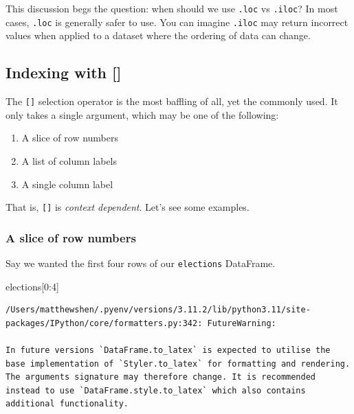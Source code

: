 \documentclass[
  letterpaper,
  DIV=11,
  numbers=noendperiod]{scrreprt}
\newenvironment{Shaded}{\begin{snugshade}}{\end{snugshade}}
\newcommand{\DecValTok}[1]{\textcolor[rgb]{0.68,0.00,0.00}{#1}}
\newcommand{\NormalTok}[1]{\textcolor[rgb]{0.00,0.23,0.31}{#1}}
\providecommand{\tightlist}{%
  \setlength{\itemsep}{0pt}\setlength{\parskip}{0pt}}\usepackage{longtable,booktabs,array}
\begin{document}
This discussion begs the question: when should we use \texttt{.loc} vs
\texttt{.iloc}? In most cases, \texttt{.loc} is generally safer to use.
You can imagine \texttt{.iloc} may return incorrect values when applied
to a dataset where the ordering of data can change.

\hypertarget{indexing-with}{%
\subsection{Indexing with {[}{]}}\label{indexing-with}}

The \texttt{{[}{]}} selection operator is the most baffling of all, yet
the commonly used. It only takes a single argument, which may be one of
the following:

\begin{enumerate}
\def\labelenumi{\arabic{enumi}.}
\tightlist
\item
  A slice of row numbers
\item
  A list of column labels
\item
  A single column label
\end{enumerate}

That is, \texttt{{[}{]}} is \emph{context dependent}. Let's see some
examples.

\hypertarget{a-slice-of-row-numbers}{%
\subsubsection{A slice of row numbers}\label{a-slice-of-row-numbers}}

Say we wanted the first four rows of our \texttt{elections} DataFrame.

\begin{Shaded}
\begin{Highlighting}[]
\NormalTok{elections[}\DecValTok{0}\NormalTok{:}\DecValTok{4}\NormalTok{]}
\end{Highlighting}
\end{Shaded}

\begin{verbatim}
/Users/matthewshen/.pyenv/versions/3.11.2/lib/python3.11/site-packages/IPython/core/formatters.py:342: FutureWarning:

In future versions `DataFrame.to_latex` is expected to utilise the base implementation of `Styler.to_latex` for formatting and rendering. The arguments signature may therefore change. It is recommended instead to use `DataFrame.style.to_latex` which also contains additional functionality.
\end{verbatim}
\end{document}
